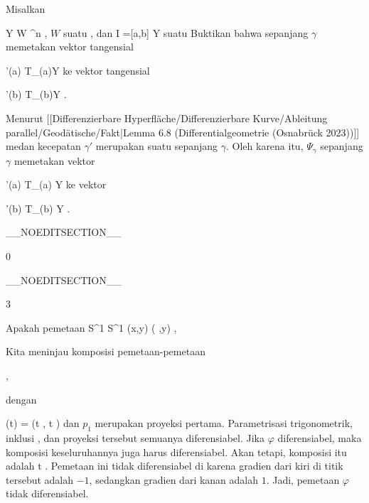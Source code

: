 {

Misalkan

\mavergleichskette
{\vergleichskette
{ Y
}
{ \subseteq }{ W
}
{ \subseteq }{ \R^n
}
{    }{
}
{   }{
}
}
{}{}{,}
$W$
suatu
,
dan
\maabb {\gamma} {I =[a,b]} {Y
} {}
suatu
Buktikan bahwa
sepanjang $\gamma$ memetakan vektor tangensial

\mavergleichskette
{\vergleichskette
{ \gamma'(a)
}
{ \in }{ T_{\gamma(a)}Y
}
{  }{
}
{    }{
}
{   }{
}
}
{}{}{}
ke vektor tangensial

\mavergleichskette
{\vergleichskette
{ \gamma'(b)
}
{ \in }{ T_{\gamma(b)}Y
}
{  }{
}
{    }{
}
{   }{
}
}
{}{}{.}

}
{

Menurut
[[Differenzierbare Hyperfläche/Differenzierbare Kurve/Ableitung parallel/Geodätische/Fakt|Lemma 6.8 (Differentialgeometrie (Osnabrück 2023))]]
medan kecepatan $\gamma'$ merupakan suatu
sepanjang $\gamma$. Oleh karena itu,
$\Psi_\gamma$ sepanjang $\gamma$ memetakan vektor

\mavergleichskette
{\vergleichskette
{ \gamma'(a)
}
{ \in }{  T_{\gamma(a)} Y
}
{  }{
}
{    }{
}
{   }{
}
}
{}{}{}
ke vektor

\mavergleichskette
{\vergleichskette
{ \gamma'(b)
}
{ \in }{  T_{\gamma(b)} Y
}
{  }{
}
{    }{
}
{   }{
}
}
{}{}{}
.

 }

__NOEDITSECTION__

{0}

{

}
{  }

__NOEDITSECTION__

{3}

{

Apakah pemetaan
\maabbeledisp {\varphi} {S^1} {S^1
} {(x,y)} {(  ,y)
} {,}

}
{

Kita meninjau komposisi pemetaan-pemetaan

 { , }

dengan

\mavergleichskettedisp
{\vergleichskette
{ \theta(t)
}
{ =} {(\cos  t , \sin  t )
}
{ } {
}
{ } {
}
{ } {
}
}
{}{}{}
dan $p_1$ merupakan proyeksi pertama. Parametrisasi trigonometrik, inklusi
 {} {,}
dan proyeksi tersebut semuanya diferensiabel. Jika $\varphi$ diferensiabel, maka komposisi keseluruhannya juga harus diferensiabel. Akan tetapi, komposisi itu adalah
\maabbeledisp {} {\R} {\R
} { t } {
} {.}
Pemetaan ini tidak diferensiabel di
 karena gradien dari kiri di titik tersebut adalah $-1$, sedangkan gradien dari kanan adalah $1$. Jadi, pemetaan $\varphi$ tidak diferensiabel.

 }

